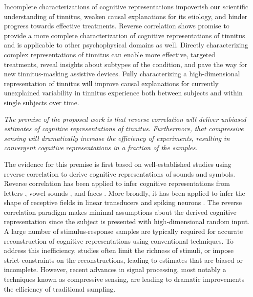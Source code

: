 \documentclass[11pt, notitlepage]{article} %
\begin{document}
Incomplete characterizations of cognitive representations impoverish our scientific understanding of tinnitus,
weaken causal explanations for its etiology, and hinder progress towards effective treatments.
Reverse correlation shows promise to provide a more complete characterization of cognitive representations of tinnitus
and is applicable to other psychophysical domains as well.
Directly characterizing complex representations of tinnitus can enable more effective, targeted treatments,
reveal insights about subtypes of the condition, and pave the way for new tinnitus-masking assistive devices.
Fully characterizing a high-dimensional representation of tinnitus will improve causal explanations
for currently unexplained variability in tinnitus experience both between subjects and within single subjects over time.


\emph{The premise of the proposed work is that reverse correlation will deliver unbiased estimates
of cognitive representations of tinnitus. Furthermore, that compressive sensing will dramatically
increase the efficiency of experiments, resulting in convergent cognitive representations
in a fraction of the samples.}

The evidence for this premise is first based on well-established studies using reverse correlation
to derive cognitive representations of sounds and symbols.
Reverse correlation has been applied to infer cognitive representations from letters
\cite{gosselinSuperstitiousPerceptionsReveal2003}, vowel sounds \cite{brimijoinInternalRepresentationVowel2013},
and faces \cite{brinkmanVisualisingMentalRepresentations2017,smithMeasuringInternalRepresentations2012}.
More broadly, it has been applied to infer the shape of receptive fields
in linear transducers and spiking neurons \cite{ringachReverseCorrelationNeurophysiology2004}.
The reverse correlation paradigm makes minimal assumptions about the derived cognitive representation
since the subject is presented with high-dimensional random input.
A large number of stimulus-response samples are typically required for accurate
reconstruction of cognitive representations using conventional techniques. To address this inefficiency,
studies often limit the richness of stimuli, or impose strict constraints on the reconstructions, leading to
estimates that are biased or incomplete. However, recent advances in signal processing, most notably
a techniques known as compressive sensing, are leading to dramatic improvements the efficiency of
traditional sampling.
\end{document}
